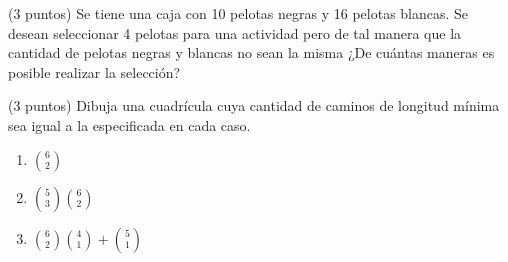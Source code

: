 \vspace{0.3cm}
\begin{problema}
    (3 puntos) Se tiene una caja con 10 pelotas negras y 16 pelotas blancas. Se desean seleccionar 4 pelotas para una actividad pero de tal manera que la cantidad de pelotas negras y blancas no sean la misma ¿De cuántas maneras es posible realizar la selección?
\end{problema}


\vspace{0.3cm}




\begin{problema}
    (3 puntos) Dibuja una cuadrícula cuya cantidad de caminos de longitud mínima sea igual a la especificada en cada caso.

    
     \renewcommand{\theenumi}{\alph{enumi})}
    \begin{enumerate}
        \item $\binom{6}{2}$
        \item $\binom{5}{3}\binom{6}{2}$
        \item $\binom{6}{2}\binom{4}{1}+\binom{5}{1}$
    \end{enumerate}
    \renewcommand{\theenumi}{\arabic{enumi}}
\end{problema}

\vspace{0.3cm}



